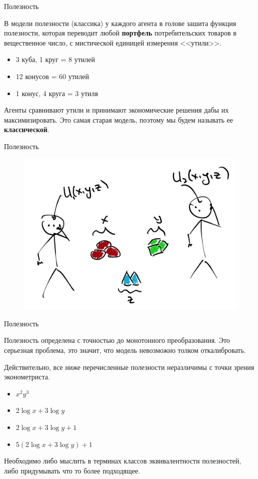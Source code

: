 \documentclass{beamer}
\begin{document}
\begin{frame}{Полезность}

В модели полезности (классика) у каждого агента в голове зашита функция полезности, которая переводит любой \textbf{портфель} потребительских товаров в вещественное число, с мистической единицей измерения <<утили>>.

\begin{itemize}
\item 3 куба, 1 круг = 8 утилей
\item 12 конусов = 60 утилей
\item 1 конус, 4 круга = 3 утиля
\end{itemize}

Агенты сравнивают утили и принимают экономические решения дабы их максимизировать. Это самая старая модель, поэтому мы будем называть ее \textbf{классической}.

\end{frame}

\begin{frame}{Полезность}

\begin{figure}[hbt]
\centering
\includegraphics[width=1 \textwidth]{pic2}
\end{figure}

\end{frame}

\begin{frame}{Полезность}

Полезность определена с точностью до монотонного преобразования. Это серьезная проблема, это значит, что модель невозможно толком откалибровать.

Действительно, все ниже перечисленные полезности неразличимы с точки зрения эконометриста. 
\begin{itemize}
\item $x^2 y^3$
\item $2 \log x + 3 \log y$
\item $2 \log x + 3 \log y + 1$
\item $5(2 \log x + 3 \log y) + 1$
\end{itemize}

Необходимо либо мыслить в терминах классов эквивалентности полезностей, либо придумывать что то более подходящее.

\end{frame}
\end{document}
